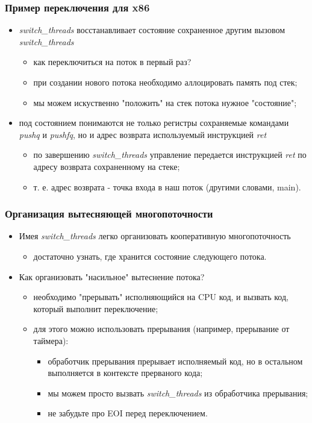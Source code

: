 \begin{frame}
\frametitle{Пример переключения для x86}
\begin{itemize}
  \item \emph{switch\_threads} восстанавливает состояние сохраненное другим
  вызовом \emph{switch\_threads}
  \begin{itemize}
    \item как переключиться на поток в первый раз?
    \item при создании нового потока необходимо аллоцировать память под стек;
    \item мы можем искуственно "положить" на стек потока нужное "состояние";
  \end{itemize}
  \item под состоянием понимаются не только регистры сохраняемые командами
  \emph{pushq} и \emph{pushfq}, но и адрес возврата используемый инструкцией
  \emph{ret}
  \begin{itemize}
    \item по завершению \emph{switch\_threads} управление передается инструкцией
    \emph{ret} по адресу возврата сохраненному на стеке;
    \item т. е. адрес возврата - точка входа в наш поток (другими словами,
    main).
  \end{itemize}
\end{itemize}
\end{frame}

\begin{frame}
\frametitle{Организация вытесняющей многопоточности}
\begin{itemize}
  \item Имея \emph{switch\_threads} легко организовать кооперативную
  многопоточность
  \begin{itemize}
    \item достаточно узнать, где хранится состояние следующего потока.
  \end{itemize}
  \item Как организовать "насильное" вытеснение потока?
  \begin{itemize}
    \item необходимо "прерывать" исполняющийся на CPU код, и вызвать код,
    который выполнит переключение;
    \item для этого можно использовать прерывания (например, прерывание от
    таймера):
    \begin{itemize}
      \item обработчик прерывания прерывает исполняемый код, но в остальном
      выполняется в контексте прерваного кода;
      \item мы можем просто вызвать \emph{switch\_threads} из обработчика
      прерывания;
      \item не забудьте про EOI перед переключением.
    \end{itemize}
  \end{itemize}
\end{itemize}
\end{frame}

